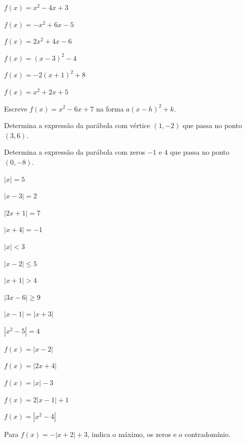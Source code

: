 \documentclass[12pt]{article}
\begin{document}


\begin{exercicios}
  \item $f(x) = x^2 - 4x + 3$
  \item $f(x) = -x^2 + 6x - 5$
  \item $f(x) = 2x^2 + 4x - 6$
  \item $f(x) = (x - 3)^2 - 4$
  \item $f(x) = -2(x + 1)^2 + 8$
  \item $f(x) = x^2 + 2x + 5$
  \item Escreve $f(x) = x^2 - 6x + 7$ na forma $a(x - h)^2 + k$.
  \item Determina a expressão da parábola com vértice $(1, -2)$ que passa no ponto $(3, 6)$.
  \item Determina a expressão da parábola com zeros $-1$ e $4$ que passa no ponto $(0, -8)$.
\end{exercicios}

\begin{exercicios}
  \item $|x| = 5$
  \item $|x - 3| = 2$
  \item $|2x + 1| = 7$
  \item $|x + 4| = -1$
  \item $|x| < 3$
  \item $|x - 2| \le 5$
  \item $|x + 1| > 4$
  \item $|3x - 6| \ge 9$
  \item $|x - 1| = |x + 3|$
  \item $|x^2 - 5| = 4$
\end{exercicios}

\begin{exercicios}
  \item $f(x) = |x - 2|$
  \item $f(x) = |2x + 4|$
  \item $f(x) = |x| - 3$
  \item $f(x) = 2|x - 1| + 1$
  \item $f(x) = |x^2 - 4|$
  \item Para $f(x) = -|x + 2| + 3$, indica o máximo, os zeros e o contradomínio.
\end{exercicios}
\end{document}
